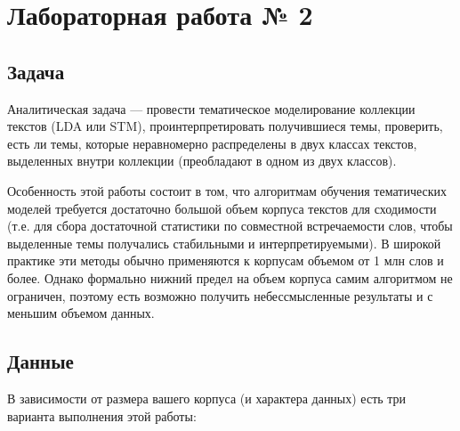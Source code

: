 \documentclass{report}
\begin{document}
\section{Лабораторная работа № 2}

\subsection{Задача}

Аналитическая задача — провести тематическое моделирование коллекции
текстов (LDA или STM), проинтерпретировать получившиеся темы,
проверить, есть ли темы, которые неравномерно распределены в двух
классах текстов, выделенных внутри коллекции (преобладают в одном из
двух классов).

Особенность этой работы состоит в том, что алгоритмам обучения
тематических моделей требуется достаточно большой объем корпуса
текстов для сходимости (т.е. для сбора достаточной статистики по
совместной встречаемости слов, чтобы выделенные темы получались
стабильными и интерпретируемыми). В широкой практике эти методы обычно
применяются к корпусам объемом от 1 млн слов и более.  Однако
формально нижний предел на объем корпуса самим алгоритмом не
ограничен, поэтому есть возможно получить небессмысленные результаты и
с меньшим объемом данных.

\subsection{Данные}

В зависимости от размера вашего корпуса (и характера данных) есть три
варианта выполнения этой работы:
\end{document}
